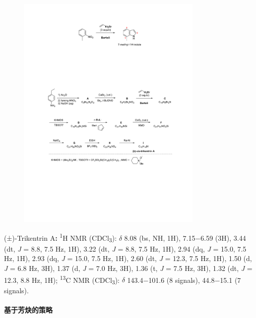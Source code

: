 \begin{figure}[h]
	\centering
	\includegraphics[width=9cm]{./pic/t7-2.pdf}
\end{figure}

\noindent(±)-Trikentrin A\textbf{:} \textsuperscript{1}H NMR
(CDCl\textsubscript{3}): $\delta$ 8.08 (bs, NH, 1H), 7.15−6.59 (3H), 3.44 (dt, \emph{J} = 8.8, 7.5 Hz, 1H), 3.22 (dt, \emph{J} = 8.8, 7.5 Hz, 1H), 2.94 (dq, \emph{J} = 15.0, 7.5 Hz, 1H), 2.93 (dq, \emph{J} = 15.0, 7.5 Hz, 1H), 2.60 (dt, \emph{J} = 12.3, 7.5 Hz, 1H), 1.50 (d, \emph{J} = 6.8 Hz, 3H), 1.37 (d, \emph{J} = 7.0 Hz, 3H), 1.36 (t, \emph{J} = 7.5 Hz, 3H), 1.32 (dt, \emph{J} = 12.3, 8.8 Hz, 1H); \textsuperscript{13}C NMR (CDCl\textsubscript{3}): $\delta$ 143.4−101.6 (8 signals), 44.8−15.1 (7 signals).

\newpage\paragraph{基于芳炔的策略}

